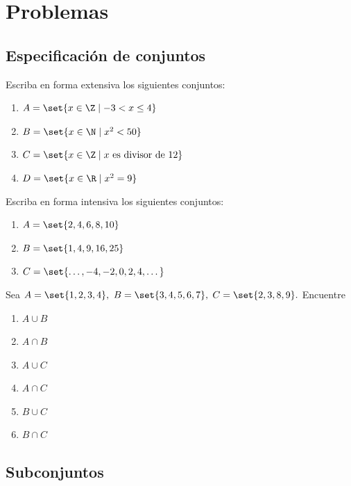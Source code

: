 \section*{Problemas}

\subsection*{Especificación de conjuntos}

\begin{problema}
	Escriba en forma extensiva los siguientes conjuntos:
	\begin{enumerate}
		\item $A = \set{x \in \Z \mid -3 < x \leq 4}$
		\item $B = \set{x \in \N \mid x^{2} < 50}$
		\item $C = \set{x \in \Z \mid x \text{ es divisor de } 12}$
		\item $D = \set{x \in \R \mid x^{2} = 9}$
	\end{enumerate}
\end{problema}

\begin{problema}
	Escriba en forma intensiva los siguientes conjuntos:
	\begin{enumerate}
		\item $A = \set{2,4,6,8,10}$
		\item $B = \set{1,4,9,16,25}$
		\item $C = \set{\dots,-4,-2,0,2,4,\dots}$
	\end{enumerate}
\end{problema}

\begin{problema}
	\label{lip:exmp:1.4.a}
	Sea $A=\set{1,2,3,4},$ $B=\set{3,4,5,6,7},$ $C=\set{2,3,8,9}.$ Encuentre 
	\begin{enumerate}
		\item $A \cup B$ 
		\item $A \cap B$ 
		\item $A \cup C$ 
		\item $A \cap C$ 
		\item $B \cup C$ 
		\item $B \cap C$
	\end{enumerate}
\end{problema}

\subsection*{Subconjuntos}

